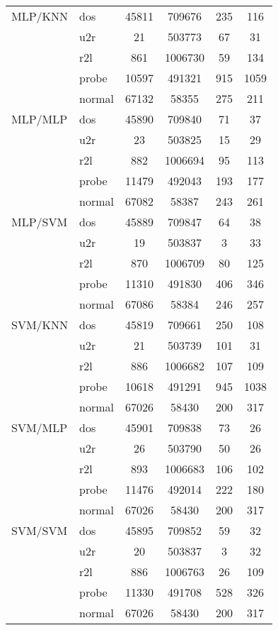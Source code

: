 \begin{longtable}{@{}llcccc@{}}
MLP/KNN & dos & 45811 & 709676 & 235 & 116 \\
 & u2r & 21 & 503773 & 67 & 31 \\
 & r2l & 861 & 1006730 & 59 & 134 \\
 & probe & 10597 & 491321 & 915 & 1059 \\
 & normal & 67132 & 58355 & 275 & 211 \\
MLP/MLP & dos & 45890 & 709840 & 71 & 37 \\
 & u2r & 23 & 503825 & 15 & 29 \\
 & r2l & 882 & 1006694 & 95 & 113 \\
 & probe & 11479 & 492043 & 193 & 177 \\
 & normal & 67082 & 58387 & 243 & 261 \\
MLP/SVM & dos & 45889 & 709847 & 64 & 38 \\
 & u2r & 19 & 503837 & 3 & 33 \\
 & r2l & 870 & 1006709 & 80 & 125 \\
 & probe & 11310 & 491830 & 406 & 346 \\
 & normal & 67086 & 58384 & 246 & 257 \\
SVM/KNN & dos & 45819 & 709661 & 250 & 108 \\
 & u2r & 21 & 503739 & 101 & 31 \\
 & r2l & 886 & 1006682 & 107 & 109 \\
 & probe & 10618 & 491291 & 945 & 1038 \\
 & normal & 67026 & 58430 & 200 & 317 \\
SVM/MLP & dos & 45901 & 709838 & 73 & 26 \\
 & u2r & 26 & 503790 & 50 & 26 \\
 & r2l & 893 & 1006683 & 106 & 102 \\
 & probe & 11476 & 492014 & 222 & 180 \\
 & normal & 67026 & 58430 & 200 & 317 \\
SVM/SVM & dos & 45895 & 709852 & 59 & 32 \\
 & u2r & 20 & 503837 & 3 & 32 \\
 & r2l & 886 & 1006763 & 26 & 109 \\
 & probe & 11330 & 491708 & 528 & 326 \\
 & normal & 67026 & 58430 & 200 & 317 \\ \bottomrule
\end{longtable}

